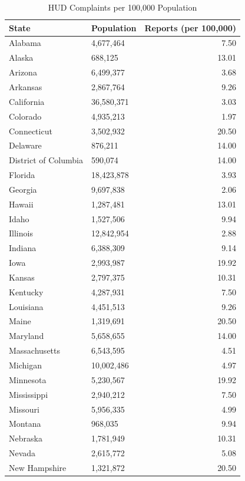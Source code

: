 \documentclass{article}
\begin{document}
\begin{table}[ht]
\centering
\caption{HUD Complaints per 100,000 Population} 
\label{tab:HUDComplaints}
{\small
\begin{tabular}{llr}
  \hline
State & Population & Reports (per 100,000) \\ 
  \hline
Alabama & 4,677,464 & 7.50 \\ 
  Alaska & 688,125 & 13.01 \\ 
  Arizona & 6,499,377 & 3.68 \\ 
  Arkansas & 2,867,764 & 9.26 \\ 
  California & 36,580,371 & 3.03 \\ 
  Colorado & 4,935,213 & 1.97 \\ 
  Connecticut & 3,502,932 & 20.50 \\ 
  Delaware & 876,211 & 14.00 \\ 
  District of Columbia & 590,074 & 14.00 \\ 
  Florida & 18,423,878 & 3.93 \\ 
  Georgia & 9,697,838 & 2.06 \\ 
  Hawaii & 1,287,481 & 13.01 \\ 
  Idaho & 1,527,506 & 9.94 \\ 
  Illinois & 12,842,954 & 2.88 \\ 
  Indiana & 6,388,309 & 9.14 \\ 
  Iowa & 2,993,987 & 19.92 \\ 
  Kansas & 2,797,375 & 10.31 \\ 
  Kentucky & 4,287,931 & 7.50 \\ 
  Louisiana & 4,451,513 & 9.26 \\ 
  Maine & 1,319,691 & 20.50 \\ 
  Maryland & 5,658,655 & 14.00 \\ 
  Massachusetts & 6,543,595 & 4.51 \\ 
  Michigan & 10,002,486 & 4.97 \\ 
  Minnesota & 5,230,567 & 19.92 \\ 
  Mississippi & 2,940,212 & 7.50 \\ 
  Missouri & 5,956,335 & 4.99 \\ 
  Montana & 968,035 & 9.94 \\ 
  Nebraska & 1,781,949 & 10.31 \\ 
  Nevada & 2,615,772 & 5.08 \\ 
  New Hampshire & 1,321,872 & 20.50 \\ 

\end{tabular}}
\end{table}
\end{document}
